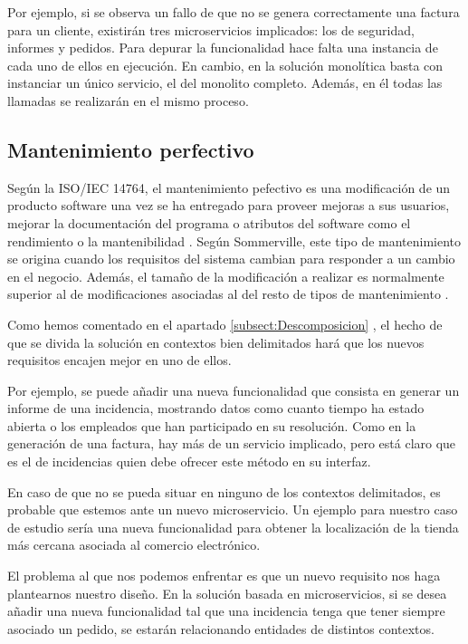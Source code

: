 \documentclass[11pt,spanish,listoffigures]{tfgetsinf}
\begin{document}
Por ejemplo, si se observa un fallo de que no se genera correctamente una factura para un cliente, existirán tres microservicios implicados: los de seguridad, informes y pedidos. Para depurar la funcionalidad hace falta una instancia de cada uno de ellos en ejecución. En cambio, en la solución monolítica basta con instanciar un único servicio, el del monolito completo. Además, en él todas las llamadas se realizarán en el mismo proceso.

\subsection{Mantenimiento perfectivo}


Según la ISO/IEC 14764, el mantenimiento pefectivo es una modificación de un producto software una vez se ha entregado para proveer mejoras a sus usuarios, mejorar la documentación del programa o atributos del software como el rendimiento o la mantenibilidad \cite{Bourque2014}. Según Sommerville, este tipo de mantenimiento se origina cuando los requisitos del sistema cambian para responder a un cambio en el negocio. Además, el tamaño de la modificación a realizar es normalmente superior al de modificaciones asociadas al del resto de tipos de mantenimiento \cite{Sommerville2010}.

Como hemos comentado en el apartado \ref{subsect:Descomposicion} , el hecho de que se divida la solución en contextos bien delimitados hará que los nuevos requisitos encajen mejor en uno de ellos.

Por ejemplo, se puede añadir una nueva funcionalidad que consista en generar un informe de una incidencia, mostrando datos como cuanto tiempo ha estado abierta o los empleados que han participado en su resolución. Como en la generación de una factura, hay más de un servicio implicado, pero está claro que es el de incidencias quien debe ofrecer este método en su interfaz.

En caso de que no se pueda situar en ninguno de los contextos delimitados, es probable que estemos ante un nuevo microservicio. Un ejemplo para nuestro caso de estudio sería una nueva funcionalidad para obtener la localización de la tienda más cercana asociada al comercio electrónico.

El problema al que nos podemos enfrentar es que un nuevo requisito nos haga plantearnos nuestro diseño. En la solución basada en microservicios, si se desea añadir una nueva funcionalidad tal que una incidencia tenga que tener siempre asociado un pedido, se estarán relacionando entidades de distintos contextos. 
\end{document}
